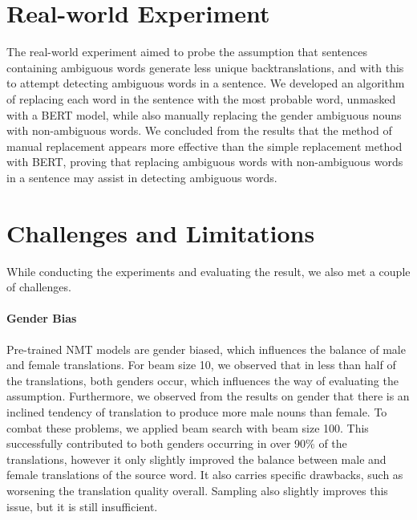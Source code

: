 
 
\section{Real-world Experiment}
\label{sec:Discussion:Real}

The real-world experiment aimed to probe the assumption that sentences containing ambiguous words generate less unique backtranslations, and with this to attempt detecting ambiguous words in a sentence. We developed an algorithm of replacing each word in the sentence with the most probable word, unmasked with a BERT model, while also manually replacing the gender ambiguous nouns with non-ambiguous words. We concluded from the results that the method of manual replacement appears more effective than the simple replacement method with BERT, proving that replacing ambiguous words with non-ambiguous words in a sentence may assist in detecting ambiguous words.


\section{Challenges and Limitations}
\label{sec:Discussion:Challenges}

While conducting the experiments and evaluating the result, we also met a couple of challenges.

\paragraph{Gender Bias}
Pre-trained NMT models are gender biased, which influences the balance of male and female translations. For beam size 10, we observed that in less than half of the translations, both genders occur, which influences the way of evaluating the assumption. Furthermore, we observed from the results on gender that there is an inclined tendency of translation to produce more male nouns than female. To combat these problems, we applied beam search with beam size 100. This successfully contributed to both genders occurring in over 90\% of the translations, however it only slightly improved the balance between male and female translations of the source word. It also carries specific drawbacks, such as worsening the translation quality overall. Sampling also slightly improves this issue, but it is still insufficient.

